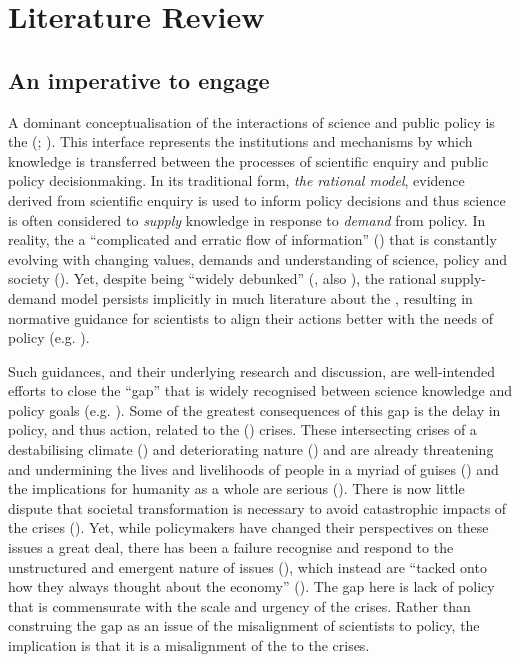 \chapter{Literature Review}\label{ch:lit}

\section{An imperative to engage}\label{sec:litspi}

A dominant conceptualisation of the interactions of science and public policy is the  (\SPI; \cite{JagannathanEtAl2023}). This interface represents the institutions and mechanisms by which knowledge is transferred between the processes of scientific enquiry and public policy decisionmaking. In its traditional form, \emph{the rational model}, evidence derived from scientific enquiry is used to inform policy decisions and thus science is often considered to \emph{supply} knowledge in response to \emph{demand} from policy. In reality, the \SPI{} a ``complicated and erratic flow of information'' (\cite{BednarekSHG2015}) that is constantly evolving with changing values, demands and understanding of science, policy and society (\cite{Obermeister2020}). Yet, despite being ``widely debunked'' (\cite{BoswellS2017}, also \cite{McNie2007,HaynesDCRHGS2011,Cairney2018}), the rational supply-demand model persists implicitly in much literature about the \SPI, resulting in normative guidance for scientists to align their actions better with the needs of policy (e.g. \cite{McNie2007,GeddesDP2018,BlessenohlS2022,Bisbal2024}).

Such guidances, and their underlying research and discussion, are well-intended efforts to close the ``gap'' that is widely recognised between science knowledge and policy goals (e.g. \cite{RapleyD2014,KarlssonG2020,CairneyTS2023}). Some of the greatest consequences of this gap is the delay in policy, and thus action, related to the  (\CAN) crises. These intersecting crises of a destabilising climate (\cite{IIPCC2022}) and deteriorating nature (\cite{IPBES2022}) and are already threatening and undermining the lives and livelihoods of people in a myriad of guises (\cite{TschakertEAKO2019}) and the implications for humanity as a whole are serious (\cite{McKayEtAl2022,WEF2024}). There is now little dispute that societal transformation is necessary to avoid catastrophic impacts of the \CAN{} crises (\cite{LaybournTS2023}). Yet, while policymakers have changed their perspectives on these issues a great deal, there has been a failure recognise and respond to the unstructured and emergent nature of \CAN{} issues (\cite{FuntowiczR1993,WesselinkH2020}), which instead are ``tacked onto how they always thought about the economy'' (\cite[p118]{Killick2023}). The gap here is lack of policy that is commensurate with the scale and urgency of the \CAN{} crises. Rather than construing the gap as an issue of the misalignment of scientists to policy, the implication is that it is a misalignment of the \SPI{} to the \CAN{} crises.

